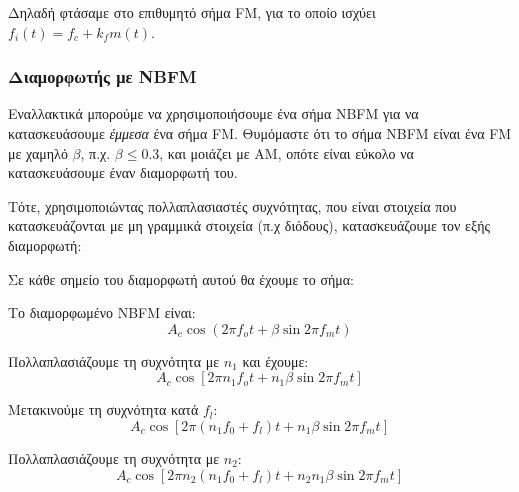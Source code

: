 \documentclass[11pt,a4paper,notitlepage,fleqn]{article}
\begin{document}
Δηλαδή φτάσαμε στο επιθυμητό σήμα FM, για το οποίο ισχύει \( f_i(t) = f_c + k_f m(t) \).

\subsubsection{Διαμορφωτής με NBFM}
Εναλλακτικά μπορούμε να χρησιμοποιήσουμε ένα σήμα NBFM για να κατασκευάσουμε \textit{έμμεσα} ένα σήμα
FM. Θυμόμαστε ότι το σήμα NBFM είναι ένα FM με χαμηλό \( β \), π.χ. \( β \leq 0.3 \), και
μοιάζει με AM, οπότε είναι εύκολο να κατασκευάσουμε έναν διαμορφωτή του.

Τότε, χρησιμοποιώντας πολλαπλασιαστές συχνότητας, που είναι στοιχεία που κατασκευάζονται
με μη γραμμικά στοιχεία (π.χ διόδους), κατασκευάζουμε τον εξής διαμορφωτή:


Σε κάθε σημείο του διαμορφωτή αυτού θα έχουμε το σήμα:
\begin{enumpar}
	\item Το διαμορφωμένο NBFM είναι: \[ A_c \cos\left( 2πf_o t + β\sin 2πf_m t \right) \]
	\item Πολλαπλασιάζουμε τη συχνότητα με \( n_1 \) και έχουμε:
	\[
	A_c\cos \left[ 2π n_1 f_o t + n_1 β \sin 2πf_m t \right]
	\]
	\item Μετακινούμε τη συχνότητα κατά \( f_l \):
	\[
	A_c\cos \left[ 2π (n_1 f_0 + f_l) t + n_1 β \sin 2π f_m t \right]
	\]
	\item Πολλαπλασιάζουμε τη συχνότητα με \( n_2 \):
	\[
	A_c\cos \left[ 2π n_2(n_1 f_0 + f_l ) t + n_2 n_1 β \sin 2πf_m t \right]
	\]
\end{enumpar}
\end{document}
